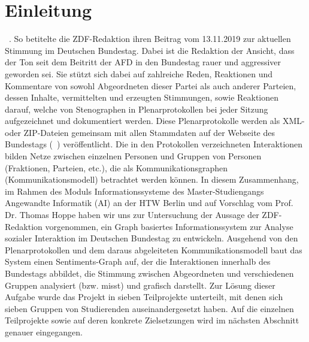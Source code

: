 \section{Einleitung}\label{sec:01_01_einleitung}
~\cite{TonImBundesTag2019}. So betitelte die
ZDF-Redaktion ihren Beitrag vom 13.11.2019 zur aktuellen Stimmung im
Deutschen Bundestag. Dabei ist die Redaktion der Ansicht, dass der Ton
seit dem Beitritt der AFD in den Bundestag rauer und aggressiver geworden
sei. Sie stützt sich dabei auf zahlreiche Reden, Reaktionen und Kommentare
von sowohl Abgeordneten dieser Partei als auch anderer Parteien,
dessen Inhalte, vermittelten und erzeugten Stimmungen, sowie Reaktionen
darauf, welche von Stenographen in Plenarprotokollen bei jeder Sitzung
aufgezeichnet und dokumentiert werden. Diese Plenarprotokolle werden als XML-
oder ZIP-Dateien gemeinsam mit allen Stammdaten auf der Webseite des Bundestags
(~\cite{OpenData2019}) veröffentlicht. Die in den Protokollen
verzeichneten Interaktionen bilden Netze 
zwischen einzelnen Personen und Gruppen von Personen (Fraktionen, Parteien,
etc.), die als Kommunikationsgraphen (Kommunikationsmodell) betrachtet werden
können. In diesem Zusammenhang, im Rahmen des Moduls Informationssysteme des
Master-Studiengangs Angewandte Informatik (AI) an der HTW
Berlin und auf Vorschlag vom Prof. Dr. Thomas Hoppe haben wir uns zur
Untersuchung der Aussage der ZDF-Redaktion vorgenommen, ein Graph
basiertes Informationssystem zur Analyse sozialer Interaktion im Deutschen Bundestag
zu entwickeln. Ausgehend von den Plenarprotokollen und dem daraus
abgeleiteten Kommunikationsmodell baut das System einen Sentiments-Graph auf,
der die Interaktionen innerhalb des Bundestags abbildet, die Stimmung zwischen
Abgeordneten und verschiedenen Gruppen analysiert (bzw. misst) und grafisch
darstellt. Zur Lösung dieser Aufgabe wurde das Projekt in sieben Teilprojekte
unterteilt, mit denen sich sieben Gruppen von Studierenden auseinandergesetzt
haben. Auf die einzelnen Teilprojekte sowie auf deren konkrete Zielsetzungen
wird im nächsten Abschnitt genauer eingegangen.